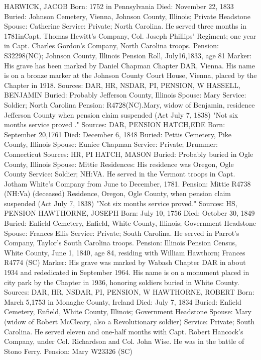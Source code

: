 HARWICK, JACOB 
Born: 1752 in Pennsylvania Died: November 22, 1833 
Buried: Johnson Cemetery, Vienna, Johnson County, Illinois; Private Headstone 
Spouse: Catherine Service: Private; North Carolina. He served three months in 1781inCapt. Thomas Hewitt's Company, Col. Joseph Phillips' Regiment; one year in Capt. Charles Gordon's Company, North Carolina troops. 
Pension: S32298(NC); Johnson County, Illinois Pension Roll, July16,1833, age 81 
Marker: His grave has been marked by Daniel Chapman Chapter DAR, Vienna. His name is on a bronze marker at  the Johnson County Court House, Vienna, placed by the Chapter in 1918. 
Sources: DAR, HR, NSDAR, PI, PENSION, W 
HASSELL, BENJAMIN 
Buried: Probably Jefferson County, Illinois Spouse: Mary 
Service: Soldier; North Carolina 
Pension: R4728(NC).Mary, widow of Benjamin, residence Jefferson County when pension claim suspended (Act July 7, 1838) "Not six months service proved ." 
Sources: DAR, PENSION 
HATCH,EDE 
Born: September 20,1761 
Died: December 6, 1848 
Buried: Pettis Cemetery, Pike County, Illinois 
Spouse: Eunice Chapman 
Service: Private; Drummer: Connecticut 
Sources: HR, PI 
HATCH, MASON 
Buried: Probably buried in Ogle County, Illinois 
Spouse: Mittie 
Residences: His residence was Oregon, Ogle County 
Service: Soldier; NH:VA. He served in the Vermont troops in Capt. Jotham White's Company from June to December, 1781. 
Pension: Mittie R4738 (NH:Va) (deceased) 
Residence, Oregon, Ogle County, when pension claim suspended (Act July 7, 1838) "Not six months service proved." 
Sources: HS, PENSION 
HAWTHORNE, JOSEPH 
Born: July 10, 1756 
Died: October 30, 1849 
Buried: Enfield Cemetery, Enfield, White County, Illinois; Government Headstone 
Spouse: Frances Ellis 
Service: Private; South Carolina. He served in Parrot's Company, Taylor's South Carolina troops. 
Pension: Illinois Pension Census, White County, June 1, 1840, age 84, residing with William Hawthorn; Frances R4774 (SC) 
Marker: His grave was marked by Wabash Chapter DAR in about 1934 and rededicated in September 1964. His name is on a monument placed in city park by the Chapter in 1936, honoring soldiers buried in White County. 
Sources: DAR, HR, NSDAR, PI, PENSION, W 
HAWTHORNE, ROBERT 
Born: March 5,1753 in Monaghe County, Ireland 
Died: July 7, 1834 
Buried: Enfield Cemetery, Enfield, White County, Illinois; Government Headstone 
Spouse: Mary (widow of Robert McCleary, also a Revolutionary soldier) 
Service: Private; South Carolina. He served eleven and one-half months with Capt. Robert Hancock's Company, under Col. Richardson and Col. John Wise. He was in the battle of Stono Ferry. Pension: Mary W23326 (SC) 
